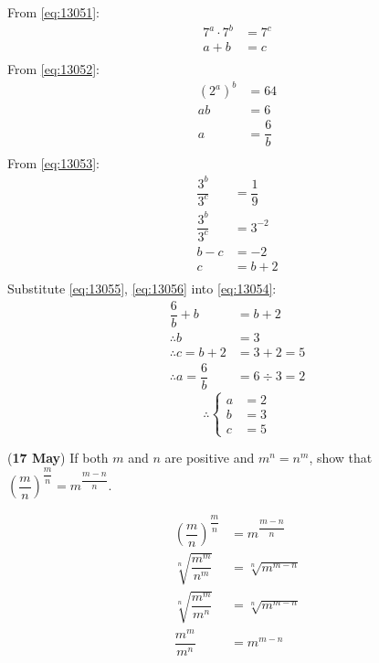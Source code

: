 \documentclass[12pt, answers]{exam} %
\renewcommand{\frac}[2]{\dfrac{#1}{#2}}
\begin{document}
\begin{questions}
\begin{solution}
		From \eqref{eq:13051}:
		\begin{align*}
			7^{a} \cdot 7^{b} & = 7^{c}                      \\
			a + b             & = c \label{eq:13054} \tag{4} \\
		\end{align*}
		From \eqref{eq:13052}:
		\begin{align*}
			\left(2^{a}\right)^{b} & = 64                                   \\
			ab                     & = 6                                    \\
			a                      & = \frac{6}{b} \label{eq:13055} \tag{5} \\
		\end{align*}
		From \eqref{eq:13053}:
		\begin{align*}
			\frac{3^{b}}{3^{c}} & = \frac{1}{9}                    \\
			\frac{3^{b}}{3^{c}} & = 3^{-2}                         \\
			b - c               & = -2                             \\
			c                   & = b + 2 \label{eq:13056} \tag{6} \\
		\end{align*}
		Substitute \eqref{eq:13055}, \eqref{eq:13056} into \eqref{eq:13054}:
		\begin{align*}
			\frac{6}{b} + b            & = b + 2        \\
			\therefore b               & = 3            \\
			\therefore c = b + 2       & = 3 + 2 = 5    \\
			\therefore a = \frac{6}{b} & = 6 \div 3 = 2
		\end{align*}
		\[
			\therefore
			\begin{cases}
				a & = 2 \\
				b & = 3 \\
				c & = 5
			\end{cases}
		\]
	\end{solution}

	\question (\textbf{17 May}) If both \(m\) and \(n\) are positive and
	\(m^{n} = n^{m}\), show that \(\left(\frac{m}{n}\right)^{\frac{m}{n}} = m^{\frac{m - n}{n}}\).
	\begin{solution}
		\begin{align*}
			\left(\frac{m}{n}\right)^{\frac{m}{n}} & = m^{\frac{m - n}{n}} \\
			\sqrt[n]{\frac{m^{m}}{n^{m}}}          & = \sqrt[n]{m^{m-n}}   \\
			\sqrt[n]{\frac{m^{m}}{m^{n}}}          & = \sqrt[n]{m^{m-n}}   \\
			\frac{m^{m}}{m^{n}}                    & = m^{m-n}
		\end{align*}
	\end{solution}


\end{questions}
\end{document}
